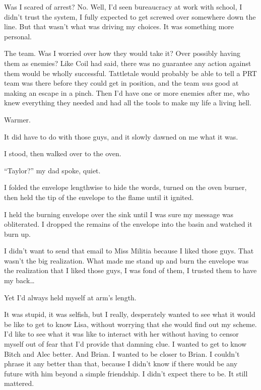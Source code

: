 Was I scared of arrest?  No.  Well, I'd seen bureaucracy at work with school, I didn't trust the system, I fully expected to get screwed over somewhere down the line.  But that wasn't what was driving my choices.  It was something more personal.



The team.  Was I worried over how they would take it?  Over possibly having them as enemies?  Like Coil had said, there was no guarantee any action against them would be wholly successful.  Tattletale would probably be able to tell a PRT team was there before they could get in position, and the team \emph{was} good at making an escape in a pinch.  Then I'd have one or more enemies after me, who knew everything they needed and had all the tools to make my life a living hell.



Warmer.



It did have to do with those guys, and it slowly dawned on me what it was.



I stood, then walked over to the oven.



``Taylor?'' my dad spoke, quiet.



I folded the envelope lengthwise to hide the words, turned on the oven burner, then held the tip of the envelope to the flame until it ignited.



I held the burning envelope over the sink until I was sure my message was obliterated.  I dropped the remains of the envelope into the basin and watched it burn up.



I didn't want to send that email to Miss Militia because I liked those guys.  That wasn't the big realization.  What made me stand up and burn the envelope was the realization that I liked those guys, I was fond of them, I trusted them to have my back\ldots



Yet I'd always held myself at arm's length.



It was stupid, it was selfish, but I really, desperately wanted to see what it would be like to get to know Lisa, without worrying that she would find out my scheme.  I'd like to see what it was like to interact with her without having to censor myself out of fear that I'd provide that damning clue.  I wanted to get to know Bitch and Alec better.  And Brian.  I wanted to be closer to Brian.  I couldn't phrase it any better than that, because I didn't know if there would be any future with him beyond a simple friendship.  I didn't expect there to be.  It still mattered.



